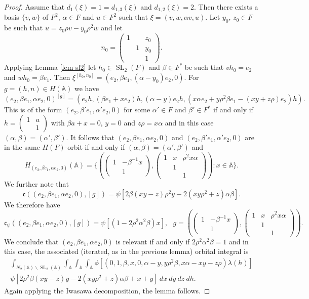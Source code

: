 \documentclass[12pt]{amsart}
\newcommand{\SL}{\operatorname{SL}}
\newcommand{\A}{\mathbb{A}}
\newcommand{\bs}{\backslash}
\newcommand{\sm}[4]{\left(\begin{smallmatrix}{#1}&{#2}\\{#3}&{#4}\end{smallmatrix}\right)}
\renewcommand{\c}{\mathfrak{c}}
\theoremstyle{remark}
\begin{document}
\begin{proof}
Assume that $d_1(\xi)=1=d_{1,3}(\xi)$ and $d_{1,2}(\xi)=2$. Then there exists a basis $\{v,w\}$ of $F^2$, $\alpha\in F$ and $u\in F^2$ such that $\xi=(v,w,\alpha v,u)$. 
Let $y_0,\,z_0\in F$ be such that $u=z_0\rho v-y_0\rho^2 w$ and let
\[
n_0=\begin{pmatrix}
1 &  & z_0 \\  & 1 & y_0 \\ & & 1
\end{pmatrix}.
\]
Applying Lemma \ref{lem sl2} let $h_0\in \SL_2(F)$ and $\beta\in F^*$ be such that $vh_0=e_2$ and $wh_0=\beta e_1$.
Then $\xi^{[h_0,n_0]}=(e_2,\beta e_1,(\alpha-y_0) e_2,0)$. 
For $g=(h,n)\in H(\A)$ we have
\[
(e_2,\beta e_1,\alpha e_2,0)^{[g]}=(e_2 h,(\beta e_1+xe_2)h,(\alpha-y) e_2 h,(x\alpha e_2+y\rho^2\beta  e_1-(xy+z\rho) e_2)h).
\]
This is of the form $(e_2,\beta' e_1,\alpha' e_2,0)$ for some $\alpha'\in F$ and $\beta'\in F^*$ if and only if
$h=\sm{1}{a}{}{1}$ with $\beta a+x=0$, $y=0$ and $z\rho=x\alpha$ and in this case $(\alpha,\beta)=(\alpha',\beta')$. 
It follows that $(e_2,\beta e_1,\alpha e_2,0)$ and $(e_2,\beta' e_1,\alpha' e_2,0)$ are in the same $H(F)$-orbit if and only if $(\alpha,\beta)=(\alpha',\beta')$ and
\[
H_{(e_2,\beta e_1,\alpha e_2,0)}(\A)=\{  (\begin{pmatrix} 1 & -\beta^{-1}x \\  & 1 \end{pmatrix},    \begin{pmatrix}
1 & x & \rho^2 x\alpha\\  & 1 &  \\ & & 1
\end{pmatrix}):x\in \A  \}.
\]
We further note that
\[
\c((e_2,\beta e_1,\alpha e_2,0),[g])=\psi[2\beta(xy-z)\rho^2y-2(xy\rho^2+z)\alpha \beta].
\]
We therefore have
\[
\c_\psi((e_2,\beta e_1,\alpha e_2,0),[g])=\psi[(1-2\rho^2\alpha^2\beta)x],\ \ \ g=(\begin{pmatrix} 1 & -\beta^{-1}x \\  & 1 \end{pmatrix},    \begin{pmatrix}
1 & x & \rho^2 x\alpha\\  & 1 &  \\ & & 1
\end{pmatrix}).
\]
We conclude that $(e_2,\beta e_1,\alpha e_2,0)$ is relevant if and only if $2\rho^2\alpha^2\beta=1$ and in this case, the associated (iterated, as in the previous lemma) orbital integral is
\begin{multline*}
\int_{N_2(\A)\bs \SL_2(\A)}\int_\A\int_\A\int_\A \phi[(0,1,\beta,x,0,\alpha-y,y\rho^2\beta,x\alpha-xy-z\rho)\lambda(h)] \\ \psi[2\rho^2\beta(xy-z)y-2(xy\rho^2+z)\alpha \beta+x+y] \ dx\ dy\ dz\ dh.
\end{multline*}
Again applying the Iwasawa decomposition, the lemma follows.
\end{proof}
\end{document}
